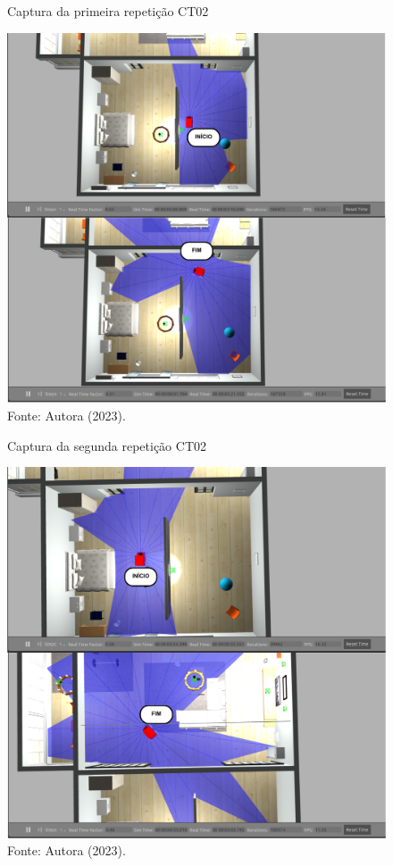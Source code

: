 \begin{figure}[H]
    \centering
    \caption{Captura da primeira repetição CT02}
    \includegraphics[scale=0.5]{ct02_1.png}
    \caption*{Fonte: Autora (2023).}
    \label{fig:ct02_1}
\end{figure}


\begin{figure}[H]
    \centering
    \caption{Captura da segunda repetição CT02}
    \includegraphics[scale=0.5]{ct02_2.png}
    \caption*{Fonte: Autora (2023).}
    \label{fig:ct02_2}
\end{figure}

